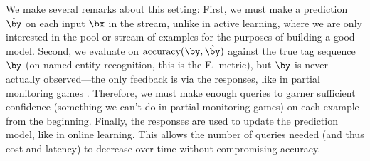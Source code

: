 
We make several remarks about this setting:
First, we must make a prediction $\hat \by$ on each input $\bx$ in the stream,
unlike in active learning, where we are only interested in the pool or stream of examples
for the purposes of building a good model.
Second, we evaluate on $\accuracy(\by, \byt)$ against the true tag sequence $\by$
(on named-entity recognition, this is the F$_1$ metric),
but $\by$ is never actually observed---the only feedback is via the responses,
like in partial monitoring games \citep{cesabianchi06regret}.
Therefore, we must make enough queries to garner sufficient confidence
(something we can't do in partial monitoring games)
on each example from the beginning.
Finally, the responses are used to update the prediction model, like in online learning.
This allows the number of queries needed (and thus cost and latency) to decrease over time
without compromising accuracy.



